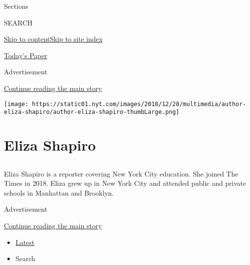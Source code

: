 Sections

SEARCH

\protect\hyperlink{site-content}{Skip to
content}\protect\hyperlink{site-index}{Skip to site index}

\href{https://myaccount.nytimes.com/auth/login?response_type=cookie\&client_id=vi}{}

\href{https://www.nytimes.com/section/todayspaper}{Today's Paper}

Advertisement

\protect\hyperlink{after-top}{Continue reading the main story}

\texttt{[image: https://static01.nyt.com/images/2018/12/28/multimedia/author-eliza-shapiro/author-eliza-shapiro-thumbLarge.png]}

\hypertarget{eliza-shapiro}{%
\section{Eliza Shapiro}\label{eliza-shapiro}}

\subsection{}

Eliza Shapiro is a reporter covering New York City education. She joined
The Times in 2018. Eliza grew up in New York City and attended public
and private schools in Manhattan and Brooklyn.

Advertisement

\protect\hyperlink{after-mid1}{Continue reading the main story}

\begin{itemize}
\tightlist
\item
  \protect\hyperlink{stream-panel}{Latest}
\item
  Search
\end{itemize}

